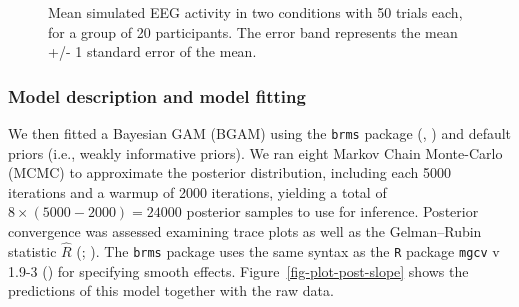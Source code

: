 \documentclass[
  doc,
  floatsintext,
  longtable,
  a4paper,
  nolmodern,
  notxfonts,
  notimes,
  colorlinks=true,linkcolor=blue,citecolor=blue,urlcolor=blue]{apa7}
\begin{document}
\begin{figure}[!htb]

\caption{\label{fig-eeg}Mean simulated EEG activity in two conditions
with 50 trials each, for a group of 20 participants. The error band
represents the mean +/- 1 standard error of the mean.}


\end{figure}%

\subsubsection{Model description and model
fitting}\label{model-description-and-model-fitting}

We then fitted a Bayesian GAM (BGAM) using the \texttt{brms} package
(, )
and default priors (i.e., weakly informative priors). We ran eight
Markov Chain Monte-Carlo (MCMC) to approximate the posterior
distribution, including each 5000 iterations and a warmup of 2000
iterations, yielding a total of \(8 \times (5000-2000) = 24000\)
posterior samples to use for inference. Posterior convergence was
assessed examining trace plots as well as the Gelman--Rubin statistic
\(\hat{R}\) (;
). The \texttt{brms}
package uses the same syntax as the \texttt{R} package \texttt{mgcv} v
1.9-3 () for specifying smooth effects.
Figure~\ref{fig-plot-post-slope} shows the predictions of this model
together with the raw data.
\end{document}
